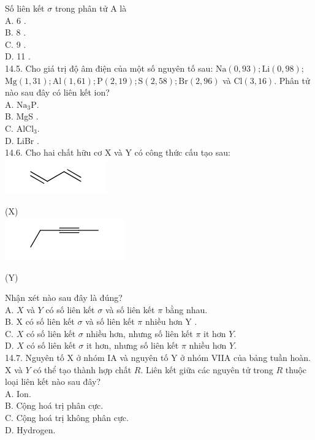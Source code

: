 \documentclass[10pt]{article}
\begin{document}
Số liên kết $\sigma$ trong phân tử A là\\
A. 6 .\\
B. 8 .\\
C. 9 .\\
D. 11 .\\
14.5. Cho giá trị độ âm điện của một số nguyên tố sau: $\mathrm{Na}(0,93) ; \mathrm{Li}(0,98)$; $\mathrm{Mg}(1,31) ; \mathrm{Al}(1,61) ; \mathrm{P}(2,19) ; \mathrm{S}(2,58) ; \mathrm{Br}(2,96)$ và $\mathrm{Cl}(3,16)$. Phân tử nào sau đây có liên kết ion?\\
A. $\mathrm{Na}_{3} \mathrm{P}$.\\
B. MgS .\\
C. $\mathrm{AlCl}_{3}$.\\
D. LiBr .\\
14.6. Cho hai chất hữu cơ X và Y có công thức cấu tạo sau:\\
\includegraphics{smile-0b352f25a70ec0798b6ee6fc501bd3194b845cec}

(X)\\
\includegraphics{smile-e9d0bffc73de7f89a010f40db89a7c535810b02c}

(Y)

Nhận xét nào sau đây là đúng?\\
A. $X$ và $Y$ có số liên kết $\sigma$ và số liên kết $\pi$ bằng nhau.\\
B. X có số liên kết $\sigma$ và số liên kết $\pi$ nhiều hơn Y .\\
C. $X$ có số liên kết $\sigma$ nhiều hơn, nhưng số liên kết $\pi$ it hơn $Y$.\\
D. $X$ có số liên kết $\sigma$ it hơn, nhưng số liên kết $\pi$ nhiều hơn $Y$.\\
14.7. Nguyên tố X ở nhóm IA và nguyên tố Y ở nhóm VIIA của bảng tuần hoàn. X và $Y$ có thể tạo thành hợp chất $R$. Liên kết giữa các nguyên tử trong $R$ thuộc loại liên kết nào sau đây?\\
A. Ion.\\
B. Cộng hoá trị phân cực.\\
C. Cộng hoá trị không phân cực.\\
D. Hydrogen.
\end{document}
